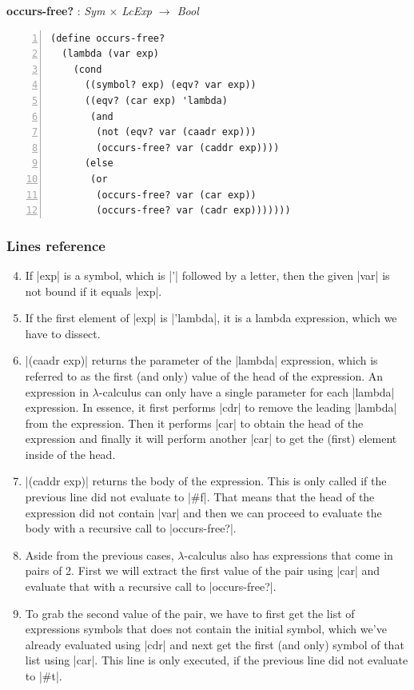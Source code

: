 \documentclass[a4paper]{article}
\begin{document}
\textbf{occurs-free?} : \textit{Sym $\times$ LcExp $\rightarrow$ Bool}
\begin{lstlisting}[aboveskip=0pt,numbers=left]
(define occurs-free?
  (lambda (var exp)
    (cond
      ((symbol? exp) (eqv? var exp))
      ((eqv? (car exp) 'lambda)
       (and
        (not (eqv? var (caadr exp)))
        (occurs-free? var (caddr exp))))
      (else
       (or
        (occurs-free? var (car exp))
        (occurs-free? var (cadr exp)))))))
\end{lstlisting}

\subsubsection*{Lines reference}

\begin{enumerate}
\setcounter{enumi}{3}
\item If |exp| is a symbol, which is |'| followed by a letter, then the given |var| is not bound if it equals |exp|.
\item If the first element of |exp| is |'lambda|, it is a lambda expression, which we have to dissect.
\setcounter{enumi}{6}
\item |(caadr exp)| returns the parameter of the |lambda| expression, which is referred to as the first (and only) value of the head of the expression. An expression in $\lambda$-calculus can only have a single parameter for each |lambda| expression. In essence, it first performs |cdr| to remove the leading |lambda| from the expression. Then it performs |car| to obtain the head of the expression and finally it will perform another |car| to get the (first) element inside of the head.
\item |(caddr exp)| returns the body of the expression. This is only called if the previous line did not evaluate to |#f|. That means that the head of the expression did not contain |var| and then we can proceed to evaluate the body with a recursive call to |occurs-free?|.
\setcounter{enumi}{10}
\item Aside from the previous cases, $\lambda$-calculus also has expressions that come in pairs of 2. First we will extract the first value of the pair using |car| and evaluate that with a recursive call to |occurs-free?|.
\item To grab the second value of the pair, we have to first get the list of expressions symbols that does not contain the initial symbol, which we've already evaluated using |cdr| and next get the first (and only) symbol of that list using |car|. This line is only executed, if the previous line did not evaluate to |#t|.
\end{enumerate}
\end{document}
